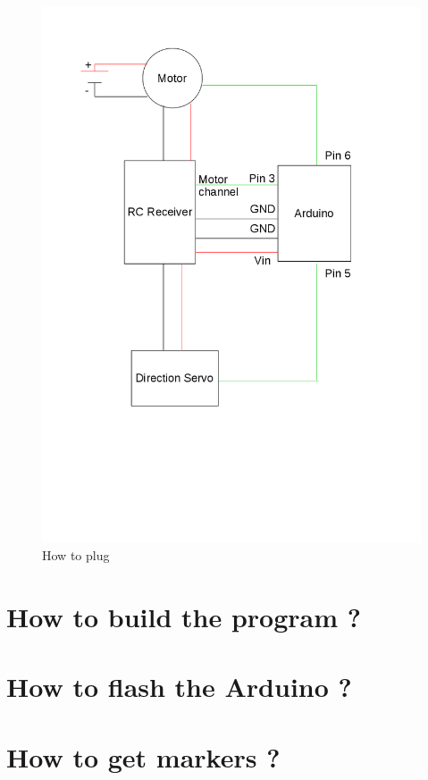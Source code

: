 \documentclass[a4paper,11pt]{report}
\begin{document}
\begin{figure}[!ht]
\centering
\includegraphics[scale=0.5]{img_static/wires}
\caption{How to plug}
\label{fig:wires}
\end{figure}

\section{How to build the program ?}

\section{How to flash the Arduino ?}

\section{How to get markers ?}
\end{document}
